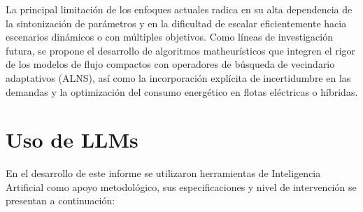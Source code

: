 \documentclass[letter, 10pt]{article}
\begin{document}
\vspace{0.25cm}

La principal limitaci\'on de los enfoques actuales radica en su alta dependencia de la sintonizaci\'on de par\'ametros y en la dificultad de escalar eficientemente hacia escenarios din\'amicos o con m\'ultiples objetivos. Como l\'ineas de investigaci\'on futura, se propone el desarrollo de algoritmos matheur\'isticos que integren el rigor de los modelos de flujo compactos con operadores de b\'usqueda de vecindario adaptativos (ALNS), as\'i como la incorporaci\'on expl\'icita de incertidumbre en las demandas y la optimizaci\'on del consumo energ\'etico en flotas el\'ectricas o h\'ibridas.


\section{Uso de LLMs}

En el desarrollo de este informe se utilizaron herramientas de Inteligencia Artificial como apoyo metodol\'ogico, sus especificaciones y nivel de intervenci\'on se presentan a continuaci\'on:
\end{document}

